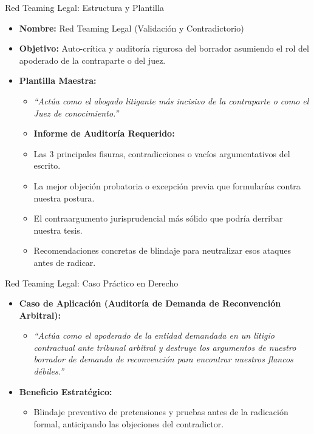 \documentclass[aspectratio=169]{beamer}
\begin{document}
\begin{frame}{Red Teaming Legal: Estructura y Plantilla}


\begin{itemize}
  \item \textbf{Nombre:} Red Teaming Legal (Validación y Contradictorio)
  \item \textbf{Objetivo:} Auto-crítica y auditoría rigurosa del borrador asumiendo el rol del apoderado de la contraparte o del juez.
  \item \textbf{Plantilla Maestra:}
  \begin{itemize}
    \item \textit{``Actúa como el abogado litigante más incisivo de la contraparte o como el Juez de conocimiento.''}
    \item \textbf{Informe de Auditoría Requerido:}
    \item Las 3 principales fisuras, contradicciones o vacíos argumentativos del escrito.
    \item La mejor objeción probatoria o excepción previa que formularías contra nuestra postura.
    \item El contraargumento jurisprudencial más sólido que podría derribar nuestra tesis.
    \item Recomendaciones concretas de blindaje para neutralizar esos ataques antes de radicar.
  \end{itemize}
\end{itemize}
\end{frame}

\begin{frame}{Red Teaming Legal: Caso Práctico en Derecho}


\begin{itemize}
  \item \textbf{Caso de Aplicación (Auditoría de Demanda de Reconvención Arbitral):}
  \begin{itemize}
    \item \textit{``Actúa como el apoderado de la entidad demandada en un litigio contractual ante tribunal arbitral y destruye los argumentos de nuestro borrador de demanda de reconvención para encontrar nuestros flancos débiles.''}
  \end{itemize}
  \item \textbf{Beneficio Estratégico:}
  \begin{itemize}
    \item Blindaje preventivo de pretensiones y pruebas antes de la radicación formal, anticipando las objeciones del contradictor.
  \end{itemize}
\end{itemize}
\end{frame}
\end{document}
